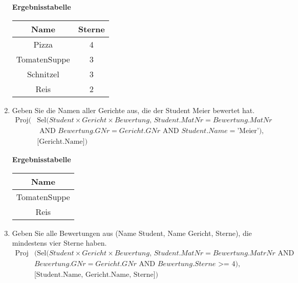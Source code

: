 \begin{enumerate}
        \begin{table}[H]
            \centering
            \textbf{Ergebnisstabelle} \\ [3pt]
            \begin{tabular}{|c|c|}
                \hline
                \textbf{Name} & \textbf{Sterne}\\
                \hline
                Pizza & 4 \\
                TomatenSuppe & 3 \\
                Schnitzel & 3 \\
                Reis & 2 \\
                \hline  
            \end{tabular}
        \end{table}

    \item Geben Sie die Namen aller Gerichte aus, die der Student Meier bewertet hat.
        \begin{align*}
            \text{Proj}\bigl(&
            \text{Sel}(Student \times Gericht \times Bewertung,\, Student.MatNr = Bewertung.MatNr \\
            &\text{ AND } Bewertung.GNr = Gericht.GNr \text{ AND } Student.Name=\text{'Meier'}),\, \\
            &\text{[Gericht.Name]}
            \bigr)
        \end{align*}

        \begin{table}[H]
            \centering
            \textbf{Ergebnisstabelle} \\ [3pt]
            \begin{tabular}{|c|}
                \hline
                \textbf{Name}\\
                \hline
                TomatenSuppe \\
                Reis \\
                \hline  
            \end{tabular}
        \end{table}

    \item Geben Sie alle Bewertungen aus (Name Student, Name Gericht, Sterne), die mindestens vier Sterne haben.
        \begin{align*}
            \text{Proj}&\bigl(
            \text{Sel}(Student \times Gericht \times Bewertung,\, Student.MatNr=Bewertung.MatrNr \text{ AND }\\
            &Bewertung.GNr=Gericht.GNr \text{ AND } Bewertung.Sterne\text{ >= } 4),\\
            &\text{[Student.Name, Gericht.Name, Sterne]}
            \bigr)
        \end{align*}


\end{enumerate}
